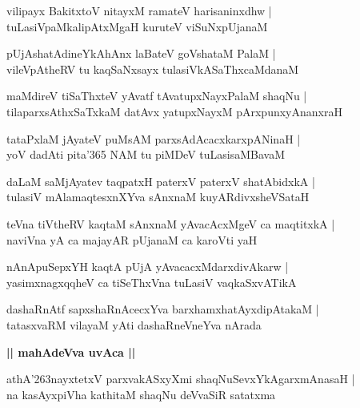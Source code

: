 \documentclass[twoside,12pt,openright]{book}
\def\S{\char'263}
\newcounter{shloka}[chapter]
\def\uvaca#1{\centerline{{\large\textbf{#1}}}}
\begin{document}
\begin{shloka}%
vilipayx BakitxtoV nitayxM ramateV harisaninxdhw |\\
tuLasiVpaMkalipAtxMgaH kuruteV viSuNxpUjanaM 
\end{shloka}

\begin{shloka}%
pUjAshatAdineYkAhAnx laBateV goVshataM PalaM |\\
vileVpAtheRV tu kaqSaNxsayx tulasiVkASaThxcaMdanaM 
\end{shloka}

\begin{shloka}%
maMdireV tiSaThxteV yAvatf tAvatupxNayxPalaM shaqNu |\\
tilaparxsAthxSaTxkaM datAvx yatupxNayxM pArxpunxyAnanxraH
\end{shloka}

\begin{shloka}%
tataPxlaM jAyateV puMsAM parxsAdAcacxkarxpANinaH |\\
yoV dadAti pita\char'365 NAM tu piMDeV tuLasisaMBavaM 
\end{shloka}

\begin{shloka}%
daLaM saMjAyatev taqpatxH paterxV paterxV shatAbidxkA |\\
tulasiV mAlamaqtesxnXYva sAnxnaM kuyARdivxsheVSataH
\end{shloka}

\begin{shloka}%
teVna tiVtheRV kaqtaM sAnxnaM yAvacAcxMgeV ca maqtitxkA |\\
naviVna yA ca majayAR pUjanaM ca karoVti yaH 
\end{shloka}

\begin{shloka}%
nAnApuSepxYH kaqtA pUjA yAvacacxMdarxdivAkarw |\\
yasimxnagxqqheV ca tiSeThxVna tuLasiV vaqkaSxvATikA
\end{shloka}

\begin{shloka}%
dashaRnAtf sapxshaRnAcecxYva barxhamxhatAyxdipAtakaM |\\
tatasxvaRM vilayaM yAti dashaRneVneYva nArada
\end{shloka}

\uvaca{|| mahAdeVva uvAca ||}

\begin{shloka}%
athA\S nayxtetxV parxvakASxyXmi shaqNuSevxYkAgarxmAnasaH |\\
na kasAyxpiVha kathitaM shaqNu deVvaSiR satatxma
\end{shloka}
\end{document}
